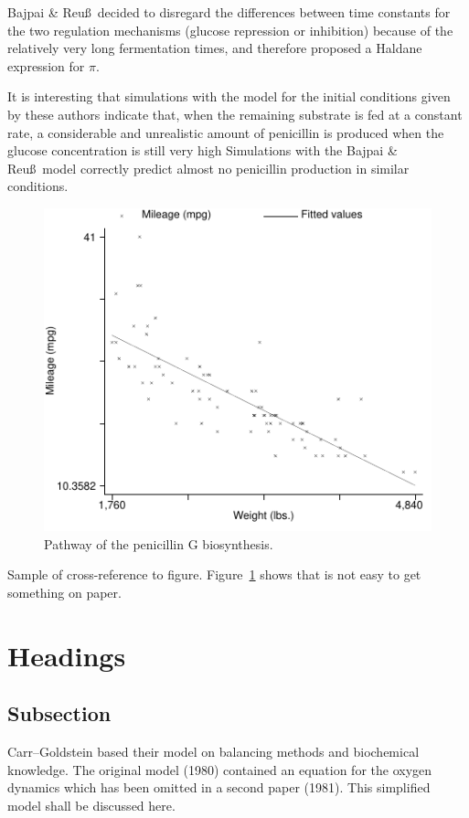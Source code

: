 \documentclass[ba]{imsart}
\numberwithin{equation}{section}
\theoremstyle{plain}
\begin{document}
Bajpai \& Reu\ss\ decided to disregard the differences between time
constants for the two regulation mechanisms (glucose repression or
inhibition) because of the relatively very long fermentation times,
and therefore proposed a Haldane expression for $\pi$.

It is interesting that simulations with the \cite{hilbe} model for the
initial conditions given by these authors indicate that, when the
remaining substrate is fed at a constant rate, a considerable and
unrealistic amount of penicillin is produced when the glucose
concentration is still very high \cite{dyke,greene,hilbe} Simulations
with the Bajpai \& Reu\ss\ model correctly predict almost no
penicillin production in similar conditions.

\begin{figure} 
\includegraphics{fig001}
\caption[]{Pathway of the penicillin G biosynthesis.}
\label{penG}
\end{figure}

Sample of cross-reference to figure.
Figure~\ref{penG} shows that is not easy to get something on paper.



\section{Headings}

\subsection{Subsection}

Carr--Goldstein based their model on balancing methods and biochemical
know\-ledge. The original model (1980) contained an equation for the
oxygen dynamics which has been omitted in a second paper (1981). This
simplified model shall be discussed here.
\end{document}
